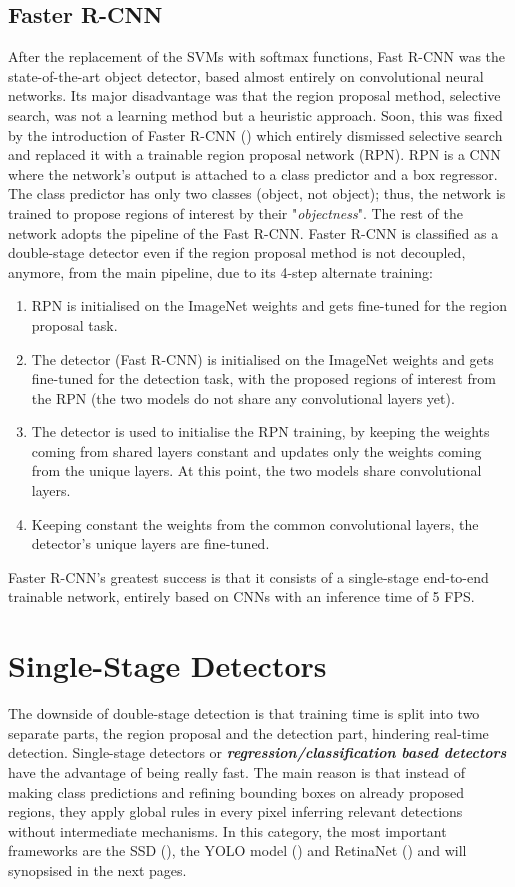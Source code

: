 \subsection{Faster R-CNN}
After the replacement of the SVMs with softmax functions, Fast R-CNN was the state-of-the-art object detector, based almost entirely on convolutional neural networks. Its major disadvantage was that the region proposal method, selective search, was not a learning method but a heuristic approach. Soon, this was fixed by the introduction of Faster R-CNN (\cite{ren2015faster}) which entirely dismissed selective search and replaced it with a trainable region proposal network (RPN). RPN is a CNN where the network's output is attached to a class predictor and a box regressor. The class predictor has only two classes (object, not object); thus, the network is trained to propose regions of interest by their "\textit{objectness}". The rest of the network adopts the pipeline of the Fast R-CNN. Faster R-CNN is classified as a double-stage detector even if the region proposal method is not decoupled, anymore, from the main pipeline, due to its 4-step alternate training:
 
\begin{enumerate}
  \item RPN is initialised on the ImageNet weights and gets fine-tuned for the region proposal task.
  \item The detector (Fast R-CNN) is initialised on the ImageNet weights and gets fine-tuned for the detection task, with the proposed regions of interest from the RPN (the two models do not share any convolutional layers yet).
  \item The detector is used to initialise the RPN training, by keeping the weights coming from shared layers constant and updates only the weights coming from the unique layers. At this point, the two models share convolutional layers.
  \item Keeping constant the weights from the common convolutional layers, the detector's unique layers are fine-tuned. 
\end{enumerate}

Faster R-CNN's greatest success is that it consists of a single-stage end-to-end trainable network, entirely based on CNNs with an inference time of 5 FPS.


\section{Single-Stage Detectors}
The downside of double-stage detection is that training time is split into two separate parts, the region proposal and the detection part, hindering real-time detection. Single-stage detectors or \textbf{\textit{regression/classification based detectors}} have the advantage of being really fast. The main reason is that instead of making class predictions and refining bounding boxes on already proposed regions, they apply global rules in every pixel inferring relevant detections without intermediate mechanisms. In this category, the most important frameworks are the SSD (\cite{liu2016ssd}), the YOLO model (\cite{redmon2016you}) and RetinaNet (\cite{lin2017focal}) and will synopsised in the next pages.
 

